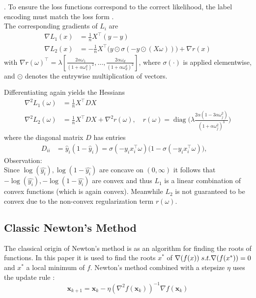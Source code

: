 \documentclass{article}
\begin{document}
\cite[Eq.~8.4]{murphy2012ml}.
To ensure the loss functions correspond to the correct likelihood, the label encoding must match the loss form \cite[Sec.~8.3.1]{murphy2012ml}.\\
The corresponding gradients of $L_i$ are
\begin{align}
\nabla L_1(x) &= \frac{1}{n} X^\top (\hat{y} - y) \\
\nabla L_2(x) &= -\frac{1}{n} X^\top \big(y \odot \sigma(-y \odot (X\omega))\big) + \nabla r(x)
\end{align}
with $\nabla r(\omega)^\top = \lambda \left[ \frac{2\alpha \omega_1}{(1 + \alpha \omega_1^2)^2}, \ldots, \frac{2\alpha \omega_d}{(1 + \alpha \omega_d^2)^2} \right]$, where $\sigma(\cdot)$ is applied elementwise, and $\odot$ denotes the entrywise multiplication of vectors.


Differentiating again yields the Hessians
\begin{align}
\nabla^2 L_1(\omega) &= \frac{1}{n} X^\top D X\\
\nabla^2 L_2(\omega) &= \frac{1}{n} X^\top D X + \nabla^2 r(\omega), \quad
r(\omega) = \operatorname{diag}\Big(\lambda \frac{2\alpha (1 - 3\alpha \omega_j^2)}{(1 + \alpha \omega_j^2)^3}\Big)
\end{align}
where the diagonal matrix $D$ has entries
\begin{align}
D_{ii} &= \hat{y}_i (1 - \hat{y}_i)=  \sigma(-y_i x_i^\top \omega) \big(1 - \sigma(-y_i x_i^\top \omega)\big),\quad 
\end{align}
Observation:\\
Since $\log(\hat{y_i}),\log(1-\hat{y_i})$ are concave on $(0,\infty)$ it follows that $-\log(\hat{y_i}),-\log(1-\hat{y_i})$ are convex and thus $L_1$ is a linear combination of convex functions (which is again convex). Meanwhile $L_2$ is not guaranteed to be convex due to the non-convex regularization term $r(\omega)$. 

\subsection{Classic Newton's Method}

The classical origin of Newton's method is as an algorithm for finding the roots of functions. In this paper it is used to find the roots $x^{*}$ of $\nabla (f(x)) \hspace{0.1cm} s.t.\nabla(f(x^{*})) = 0$ and $x^{*}$ a local minimum of $f$. Newton's method combined with a stepsize $\eta$ uses the update rule \cite{wright}:
\begin{equation}
  \mathbf{x}_{k+1} = \mathbf{x}_k - \eta (\nabla^2 f(\mathbf{x}_k))^{-1} \nabla f(\mathbf{x}_k)
\end{equation}
\end{document}
